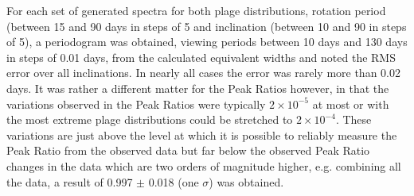 \begin{table}[!htbp]
\caption{Simulated mean equivalent widths with associated standard deviations from simulations for the 2.7\%
  plage distributions and a set of rotation periods and inclinations. In the first table results are illustrated for
  various periods and for 30{\degree}, 60{\degree} and  90{\degree} inclinations. In the second table results are
  illustrated for various inclinations and 70, 80 and 90-day periods as these are close to the
  rotation period of \prox.}
\protect\label{table:modelcomp}
\end{table}

For each set of generated spectra for both plage distributions, rotation period (between 15 and 90 days in steps of 5
and inclination (between 10{\degree} and 90{\degree} in steps of 5\degree), a periodogram was obtained, viewing periods
between 10 days and 130 days in steps of 0.01 days, from the calculated equivalent widths and noted the RMS error over
all inclinations. In nearly all cases the error was rarely more than 0.02 days. It was rather a different matter for the
Peak Ratios however, in that the variations observed in the Peak Ratios were typically $2{\times}10^{-5}$ at most or with
the most extreme plage distributions could be stretched to $2{\times}10^{-4}$. These variations are just above the level
at which it is possible to reliably measure the Peak Ratio from the observed data but far below the observed Peak Ratio
changes in the data which are two orders of magnitude higher, e.g. combining all the {\harps} data, a result of 0.997 $
\pm $ 0.018 (one $\sigma$) was obtained.

